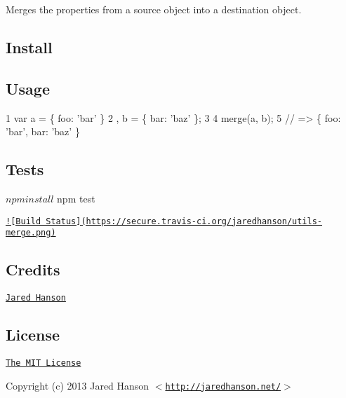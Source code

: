 Merges the properties from a source object into a destination object.

\subsection*{Install}



\subsection*{Usage}


\begin{DoxyCode}
1 var a = \{ foo: 'bar' \}
2   , b = \{ bar: 'baz' \};
3 
4 merge(a, b);
5 // => \{ foo: 'bar', bar: 'baz' \}
\end{DoxyCode}


\subsection*{Tests}

\begin{DoxyVerb}$ npm install
$ npm test
\end{DoxyVerb}


\href{http://travis-ci.org/jaredhanson/utils-merge}{\tt !\mbox{[}Build Status\mbox{]}(https\+://secure.\+travis-\/ci.\+org/jaredhanson/utils-\/merge.\+png)}

\subsection*{Credits}


\begin{DoxyItemize}
\item \href{http://github.com/jaredhanson}{\tt Jared Hanson}
\end{DoxyItemize}

\subsection*{License}

\href{http://opensource.org/licenses/MIT}{\tt The M\+I\+T License}

Copyright (c) 2013 Jared Hanson $<$\href{http://jaredhanson.net/}{\tt http\+://jaredhanson.\+net/}$>$ 